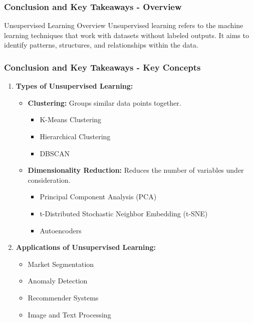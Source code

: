 \documentclass[aspectratio=169]{beamer}
\begin{document}
\begin{frame}[fragile]
    \frametitle{Conclusion and Key Takeaways - Overview}
    \begin{block}{Unsupervised Learning Overview}
        Unsupervised learning refers to the machine learning techniques that work with datasets without labeled outputs. It aims to identify patterns, structures, and relationships within the data.
    \end{block}
\end{frame}

\begin{frame}[fragile]
    \frametitle{Conclusion and Key Takeaways - Key Concepts}
    \begin{enumerate}
        \item \textbf{Types of Unsupervised Learning:}
        \begin{itemize}
            \item \textbf{Clustering:} Groups similar data points together. 
            \begin{itemize}
                \item K-Means Clustering
                \item Hierarchical Clustering
                \item DBSCAN
            \end{itemize}
            \item \textbf{Dimensionality Reduction:} Reduces the number of variables under consideration.
            \begin{itemize}
                \item Principal Component Analysis (PCA)
                \item t-Distributed Stochastic Neighbor Embedding (t-SNE)
                \item Autoencoders
            \end{itemize}
        \end{itemize}

        \item \textbf{Applications of Unsupervised Learning:}
        \begin{itemize}
            \item Market Segmentation
            \item Anomaly Detection
            \item Recommender Systems
            \item Image and Text Processing
        \end{itemize}
    \end{enumerate}
\end{frame}
\end{document}
